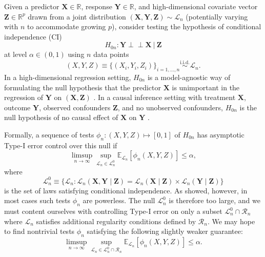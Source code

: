 \documentclass[12pt]{article}
\theoremstyle{definition}
\theoremstyle{remark}
\newcommand{\E}{\mathbb E}								%
\newcommand{\R}{\mathbb{R}}								%
\newcommand{\independent}{{\perp \! \! \! \perp}}		%
\newcommand{\iidsim}{\stackrel{\mathrm{i.i.d.}}{\sim}} 	%
\newcommand{\prx}{\bm X}								%
\newcommand{\srx}{X}									%
\newcommand{\prz}{\bm Z}								%
\newcommand{\srz}{Z}									%
\newcommand{\pry}{{\bm Y}}								%
\newcommand{\sry}{Y}									%
\newcommand{\law}{\mathcal L}							%
\newcommand{\nulllaws}{\mathscr L^0}					%
\newcommand{\regclass}{\mathscr R}					    %
\begin{document}
	Given a predictor $\prx \in \R$, response $\pry \in \R$, and high-dimensional covariate vector $\prz \in \R^{p}$ drawn from a joint distribution $(\prx, \pry, \prz) \sim \law_n$ (potentially varying with $n$ to accommodate growing $p$), consider testing the hypothesis of conditional independence (CI)
	\begin{equation}
		H_{0n}: \pry \independent \prx\ |\ \prz
		\label{conditional-independence}
	\end{equation}
	at level $\alpha \in (0,1)$ using $n$ data points 
	\begin{equation}
		\label{eq:xyz}
		(\srx, \sry, \srz) \equiv \{(\srx_i, \sry_i, \srz_i)\}_{i = 1, \dots, n} \iidsim \law_n. 
	\end{equation}
	In a high-dimensional regression setting, $H_{0n}$ is a model-agnostic way of formulating the null hypothesis that the predictor $\prx$ is unimportant in the regression of $\pry$ on $(\prx, \prz)$ \citep{CetL16}. In a causal inference setting with treatment $\prx$, outcome $\pry$, observed confounders $\prz$, and no unobserved confounders, $H_{0n}$ is the null hypothesis of no causal effect of $\prx$ on $\pry$ \citep{Pearl2009}.
	
	Formally, a sequence of tests $\phi_n: (\srx, \sry, \srz) \mapsto [0,1]$ of $H_{0n}$ has asymptotic Type-I error control over this null if 
	\begin{equation}
		\limsup_{n \rightarrow \infty}\sup_{\law_n \in \nulllaws_n} \E_{\law_n}[\phi_n(\srx,\sry,\srz)] \leq \alpha,
	\end{equation}
	where
	\begin{equation}
		\nulllaws_n \equiv \{\law_n: \law_n(\prx, \pry \mid \prz) = \law_n(\prx\mid\prz) \times \law_n(\pry\mid\prz)\}
	\end{equation}
	is the set of laws satisfying conditional independence. As \citet{Shah2018} showed, however, in most cases such tests $\phi_n$ are powerless. The null $\nulllaws_n$ is therefore too large, and we must content ourselves with controlling Type-I error on only a subset $\nulllaws_n \cap \regclass_n$ where $\law_n$ satisfies additional regularity conditions defined by $\regclass_n$. We may hope to find nontrivial tests $\phi_n$ satisfying the following slightly weaker guarantee:
	\begin{equation}
		\limsup_{n \rightarrow \infty}\sup_{\law_n \in \nulllaws_n \cap \regclass_n} \E_{\law_n}[\phi_n(\srx,\sry,\srz)] \leq \alpha.
		\label{eq:asymptotic-control}
	\end{equation}
	
\end{document}
